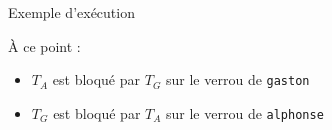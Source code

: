 \begin{frame}[fragile]{Exemple d'exécution}
{
  }

  \begin{alertblock}{À ce point :}
    \begin{itemize}
    \item $T_A$ est bloqué par $T_G$ sur le verrou de \lstinline{gaston}
    \item $T_G$ est bloqué par $T_A$ sur le verrou de \lstinline{alphonse}
    \end{itemize}
  \end{alertblock}
  
\end{frame}

\endgroup
\endinput
